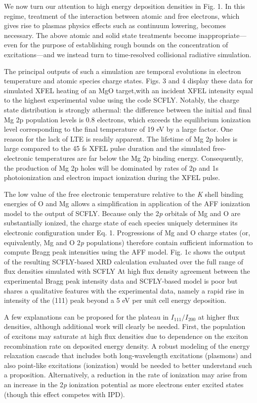 We now turn our attention to high energy deposition densities in Fig. 1.
In this regime, treatment of the interaction between atomic and free
electrons, which gives rise to plasmas physics effects such as continuum
lowering, becomes necessary. The above atomic and solid state treatments
become inappropriate---even for the purpose of establishing rough bounds
on the concentration of excitations---and we instead turn to
time-resolved collisional radiative simulation.

The principal outputs of such a simulation are temporal evolutions in
electron temperature and atomic species charge states. Figs. 3 and 4
display these data for simulated XFEL heating of an MgO target,with an
incident XFEL intensity equal to the highest experimental value using
the code SCFLY. Notably, the charge state distribution is strongly
athermal: the difference between the initial and final Mg 2p population
levels is 0.8 electrons, which exceeds the equilibrium ionization level
corresponding to the final temperature of 19 eV by a large factor. One
reason for the lack of LTE is readily apparent. The lifetime of Mg 2p
holes is large compared to the 45 fs XFEL pulse duration \cite{KESKI1974TOTAL, FUGGLE1992UNOCCUPIED} and
the simulated free-electronic temperatures are far below the Mg 2p
binding energy. Consequently, the production of Mg 2p holes will be
dominated by rates of 2p and 1s photoionization and electron impact
ionization during the XFEL pulse.

The low value of the free electronic temperature relative to the
\emph{K} shell binding energies of O and Mg allows a simplification in
application of the AFF ionization model to the output of SCFLY. Because
only the 2\emph{p} orbitals of Mg and O are substantially ionized, the
charge state of each species uniquely determines its electronic
configuration under Eq. 1. Progressions of Mg and O charge states (or,
equivalently, Mg and O 2\emph{p} populations) therefore contain
sufficient information to compute Bragg peak intensities using the AFF
model. Fig. 1c shows the output of the resulting SCFLY-based XRD
calculation evaluated over the full range of flux densities simulated
with SCFLY At high flux density agreement between the experimental Bragg
peak intensity data and SCFLY-based model is poor but shares a
qualitative features with the experimental data, namely a rapid rise in
intensity of the (111) peak beyond a 5 eV per unit cell energy
deposition.

A few explanations can be proposed for the plateau in
\(I_{111}/I_{200}\) at higher flux densities, although additional work
will clearly be needed. First, the population of excitons may saturate
at high flux densities due to dependence on the exciton recombination
rate on deposited energy density. A robust modeling of the energy
relaxation cascade that includes both long-wavelength excitations
(plasmons) and also point-like excitations (ionization) would be needed
to better understand such a proposition. Alternatively, a reduction in
the rate of ionization may arise from an increase in the 2\emph{p}
ionization potential as more electrons enter excited states (though this
effect competes with IPD).

